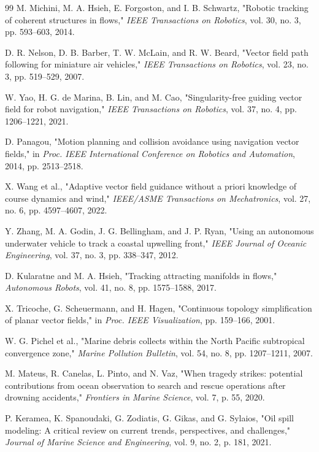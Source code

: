 \documentclass[lettersize,journal]{IEEEtran}
\begin{document}
\begin{thebibliography}{99}
 M. Michini, M. A. Hsieh, E. Forgoston, and I. B. Schwartz, "Robotic tracking of coherent structures in flows," \textit{IEEE Transactions on Robotics}, vol. 30, no. 3, pp. 593--603, 2014.

 D. R. Nelson, D. B. Barber, T. W. McLain, and R. W. Beard, "Vector field path following for miniature air vehicles," \textit{IEEE Transactions on Robotics}, vol. 23, no. 3, pp. 519--529, 2007.

 W. Yao, H. G. de Marina, B. Lin, and M. Cao, "Singularity-free guiding vector field for robot navigation," \textit{IEEE Transactions on Robotics}, vol. 37, no. 4, pp. 1206--1221, 2021.

 D. Panagou, "Motion planning and collision avoidance using navigation vector fields," in \textit{Proc. IEEE International Conference on Robotics and Automation}, 2014, pp. 2513--2518.

 X. Wang et al., "Adaptive vector field guidance without a priori knowledge of course dynamics and wind," \textit{IEEE/ASME Transactions on Mechatronics}, vol. 27, no. 6, pp. 4597--4607, 2022.

 Y. Zhang, M. A. Godin, J. G. Bellingham, and J. P. Ryan, "Using an autonomous underwater vehicle to track a coastal upwelling front," \textit{IEEE Journal of Oceanic Engineering}, vol. 37, no. 3, pp. 338--347, 2012.

 D. Kularatne and M. A. Hsieh, "Tracking attracting manifolds in flows," \textit{Autonomous Robots}, vol. 41, no. 8, pp. 1575--1588, 2017.

 X. Tricoche, G. Scheuermann, and H. Hagen, "Continuous topology simplification of planar vector fields," in \textit{Proc. IEEE Visualization}, pp. 159--166, 2001.

 W. G. Pichel et al., "Marine debris collects within the North Pacific subtropical convergence zone," \textit{Marine Pollution Bulletin}, vol. 54, no. 8, pp. 1207--1211, 2007.

 M. Mateus, R. Canelas, L. Pinto, and N. Vaz, "When tragedy strikes: potential contributions from ocean observation to search and rescue operations after drowning accidents," \textit{Frontiers in Marine Science}, vol. 7, p. 55, 2020.

 P. Keramea, K. Spanoudaki, G. Zodiatis, G. Gikas, and G. Sylaios, "Oil spill modeling: A critical review on current trends, perspectives, and challenges," \textit{Journal of Marine Science and Engineering}, vol. 9, no. 2, p. 181, 2021.


\end{thebibliography}
\end{document}
